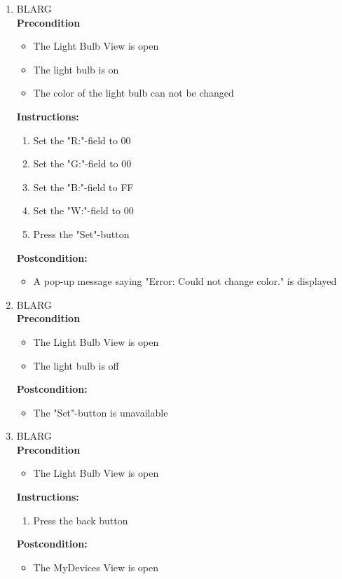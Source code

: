 \documentclass[a4paper]{article}
\newlength{\testlabellength}
\newenvironment{testlist}{\begin{enumerate}[label=\bfseries Instruction \thesubsection.\arabic* , labelindent=0pt, labelwidth=\testlabellength , leftmargin=2cm]}{\end{enumerate}}
\newenvironment{precondition}{
{\color{white}BLARG}\\ 
\textbf{Precondition}
\begin{itemize}[labelindent=0cm, labelwidth=2cm , leftmargin=1cm]
}
{\end{itemize}}
\newenvironment{instruction}{
\textbf{Instructions:}
\begin{enumerate}[label=\bfseries  \arabic*., labelindent=0cm, labelwidth=2cm , leftmargin=1cm]
}
{\end{enumerate}}
\newenvironment{postcondition}{
\textbf{Postcondition:}
\begin{itemize}[labelindent=0cm, labelwidth=2cm , leftmargin=1cm]
}
{\end{itemize}}
\begin{document}
\begin{appendices}
\begin{testlist}
	\item
		\begin{precondition}
			\item The Light Bulb View is open
			\item The light bulb is on
			\item The color of the light bulb can not be changed
		\end{precondition}
		\begin{instruction}
			\item Set the "R:"-field to 00
			\item Set the "G:"-field to 00
			\item Set the "B:"-field to FF
			\item Set the "W:"-field to 00
			\item Press the "Set"-button
		\end{instruction}
		\begin{postcondition}
			\item A pop-up message saying "Error: Could not change color." is displayed
		\end{postcondition}

	\item
		\begin{precondition}
			\item The Light Bulb View is open
			\item The light bulb is off
		\end{precondition}
		\begin{postcondition}
			\item The "Set"-button is unavailable
		\end{postcondition}

	\item
		\begin{precondition}
			\item The Light Bulb View is open
		\end{precondition}
		\begin{instruction}
			\item Press the back button
		\end{instruction}
		\begin{postcondition}
			\item The MyDevices View is open
		\end{postcondition}
    

\end{testlist}
\end{appendices}
\end{document}
